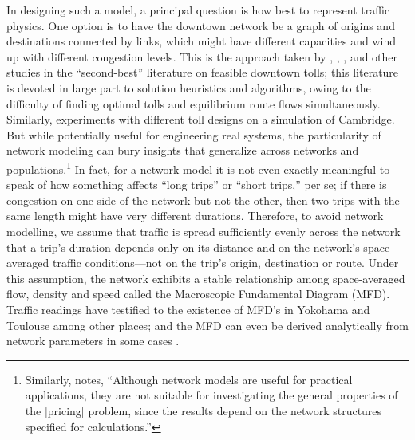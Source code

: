 \documentclass[preprint,authoryear]{elsarticle}
\begin{document}
In designing such a model, a principal question is how best to represent traffic physics. One option is to have the downtown network be a graph of origins and destinations connected by links, which might have different capacities and wind up with different congestion levels. This is the approach taken by \citet{Meng2012}, \citet{Liu2013}, \citet{Verhoef2002b}, \citet{Lawphongpanich2012} and other studies in the ``second-best'' literature on feasible downtown tolls; this literature is devoted in large part to solution heuristics and algorithms, owing to the difficulty of finding optimal tolls and equilibrium route flows simultaneously. Similarly, \citet{May2000} experiments with different toll designs on a simulation of Cambridge. But while potentially useful for engineering real systems, the particularity of network modeling can bury insights that generalize across networks and populations.\footnote{Similarly, \citet{Mun2003} notes, ``Although network models are useful for practical applications, they are not suitable for investigating the general properties of the [pricing] problem, since the results depend on the network structures specified for calculations.''} In fact, for a network model it is not even exactly meaningful to speak of how something affects ``long trips'' or ``short trips,'' per se; if there is congestion on one side of the network but not the other, then two trips with the same length might have very different durations. Therefore, to avoid network modelling, we assume that traffic is spread sufficiently evenly across the network that a trip's duration depends only on its distance and on the network's space-averaged traffic conditions---not on the trip's origin, destination or route. Under this assumption, the network exhibits a stable relationship among space-averaged flow, density and speed called the Macroscopic Fundamental Diagram (MFD). Traffic readings have testified to the existence of MFD's in Yokohama \citep{Geroliminis2008} and Toulouse \citep{Buisson2009} among other places; and the MFD can even be derived analytically from network parameters in some cases \citep{Daganzo2008a,DaganzoLehe2016}.
\end{document}
